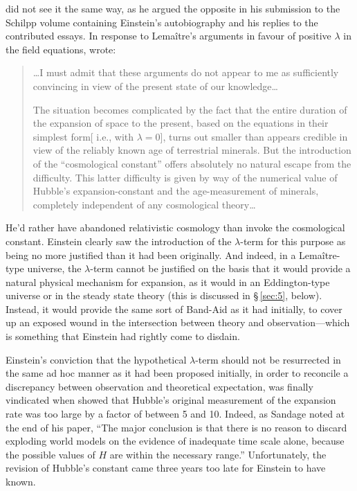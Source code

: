 \documentclass[12 pt]{article}
\begin{document}
\citet{Lemaitre1949a} did not see it the same way, as he argued the opposite in his submission to the Schilpp volume containing Einstein's autobiography and his replies to the contributed essays. In response to Lema\^{i}tre's arguments in favour of positive $\lambda$ in the field equations, \citet{Einstein1949} wrote:
\begin{quotation}
\ldots I must admit that these arguments do not appear to me as sufficiently convincing in view of the present state of our knowledge\ldots

The situation becomes complicated by the fact that the entire duration of the expansion of space to the present, based on the equations in their simplest form[ i.e., with $\lambda=0$], turns out smaller than appears credible in view of the reliably known age of terrestrial minerals. But the introduction of the ``cosmological constant'' offers absolutely no natural escape from the difficulty. This latter difficulty is given by way of the numerical value of Hubble's expansion-constant and the age-measurement of minerals, completely independent of any cosmological theory\ldots
\end{quotation}
He'd rather have abandoned relativistic cosmology than invoke the cosmological constant. Einstein clearly saw the introduction of the $\lambda$-term for this purpose as being no more justified than it had been originally. And indeed, in a Lema\^{i}tre-type universe, the $\lambda$-term cannot be justified on the basis that it would provide a natural physical mechanism for expansion, as it would in an Eddington-type universe or in the steady state theory (this is discussed in \S\,\ref{sec:5}, below). Instead, it would provide the same sort of Band-Aid as it had initially, to cover up an exposed wound in the intersection between theory and observation---which is something that Einstein had rightly come to disdain. 

Einstein's conviction that the hypothetical $\lambda$-term should not be resurrected in the same ad hoc manner as it had been proposed initially, in order to reconcile a discrepancy between observation and theoretical expectation, was finally vindicated when \citet{Sandage1958} showed that Hubble's original measurement of the expansion rate was too large by a factor of between 5 and 10. Indeed, as Sandage noted at the end of his paper, ``The major conclusion is that there is no reason to discard exploding world models on the evidence of inadequate time scale alone, because the possible values of $H$ are within the necessary range.'' Unfortunately, the revision of Hubble's constant came three years too late for Einstein to have known.
\end{document}
